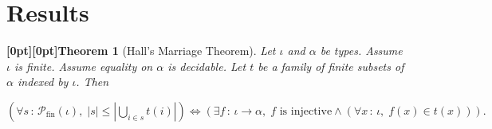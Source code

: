 \documentclass{article}
\makeatletter
\newcommand{\paperanchor}[1]{\hypertarget{#1}{}}%
\def\paperdest{\pdfextension dest}\def\paperstart{\pdfextension startlink}%
\def\paperend{\pdfextension endlink}\def\papercolor{\pdfextension colorstack}%
\let\paperdest\pdfdest\let\paperstart\pdfstartlink\let\paperend\pdfendlink\let\papercolor\pdfcolorstack
\newcommand{\paperanchor}[1]{\paperdest name{#1} xyz}%
\newcommand{\paperanchor}[1]{\special{pdf:dest (#1) [@thispage /XYZ null @ypos null]}}%
\newcommand{\paperlineanchor}[1]{\raisebox{10pt}[0pt][0pt]{\paperanchor{#1}}}
\DeclareRobustCommand{\paperresultname}[1]{\paperlineanchor{theorem:\arabic{theorem}}#1}
\theoremstyle{paperresult}
\newtheorem{theorem}{\paperresultname{Theorem}}
\makeatother
\begin{document}
\section{Results}
\begin{theorem}[{Hall's Marriage Theorem}]\label{theorem:7}
Let \(\iota\) and \(\alpha\) be types. Assume \(\iota\) is finite. Assume equality on \(\alpha\) is decidable. Let \(t\) be a family of finite subsets of \(\alpha\) indexed by \(\iota\). Then
\begin{center}
\(\displaystyle (\forall s\, :\, \mathcal{P}_{\mathrm{fin}}(\iota),\; |s| \le |\bigcup_{i\in s} t(i)|) \iff (\exists f\, :\, \iota \to \alpha,\; f\text{ is injective} \land (\forall x\, :\, \iota,\; f(x) \in t(x))).\)
\end{center}
\end{theorem}
\end{document}
